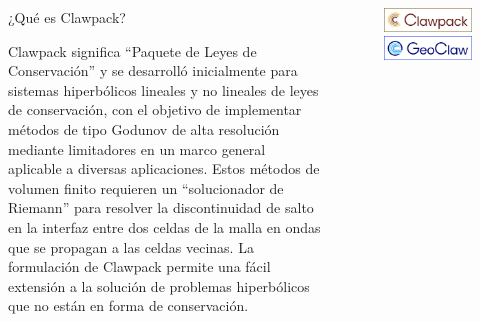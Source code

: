 \begin{frame}
  \begin{columns}
    \begin{column}{.6\paperwidth}
      \begin{block}{¿Qué es Clawpack?}
        \begin{quoting}
          Clawpack significa ``Paquete de Leyes de Conservación'' y se
          desarrolló inicialmente para sistemas hiperbólicos lineales y no
          lineales de leyes de conservación, con el objetivo de implementar
          métodos de tipo Godunov de alta resolución mediante limitadores
          en un marco general aplicable a diversas aplicaciones.
          Estos métodos de volumen finito requieren un ``solucionador de
          Riemann'' para resolver la discontinuidad de salto en la interfaz
          entre dos celdas de la malla en ondas que se propagan a las
          celdas vecinas.
          La formulación de Clawpack permite una fácil extensión a la
          solución de problemas hiperbólicos que no están en forma de
          conservación.
        \end{quoting}
      \end{block}
    \end{column}
    \begin{column}{.3\paperwidth}
      \begin{figure}[ht!]
        \centering
        \includegraphics[width=.3\paperwidth]{ClawpackLogoTitleFrame}
        \includegraphics[width=.3\paperwidth]{GeoClawLogoTitleFrame}
      \end{figure}
    \end{column}
  \end{columns}
\end{frame}

